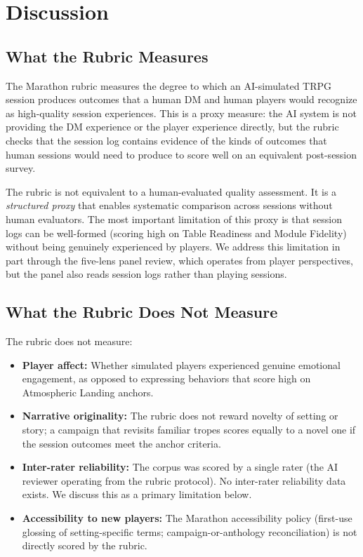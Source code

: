 
\section{Discussion}
\label{sec:discussion}

\subsection{What the Rubric Measures}

The Marathon rubric measures the degree to which an AI-simulated TRPG session produces
outcomes that a human DM and human players would recognize as high-quality session
experiences. This is a proxy measure: the AI system is not providing the DM experience
or the player experience directly, but the rubric checks that the session log contains
evidence of the kinds of outcomes that human sessions would need to produce to score
well on an equivalent post-session survey.

The rubric is not equivalent to a human-evaluated quality assessment. It is a
\textit{structured proxy} that enables systematic comparison across sessions without
human evaluators. The most important limitation of this proxy is that session logs can
be well-formed (scoring high on Table Readiness and Module Fidelity) without being
genuinely experienced by players. We address this limitation in part through the
five-lens panel review, which operates from player perspectives, but the panel also
reads session logs rather than playing sessions.

\subsection{What the Rubric Does Not Measure}

The rubric does not measure:

\begin{itemize}
  \item \textbf{Player affect:} Whether simulated players experienced genuine emotional
        engagement, as opposed to expressing behaviors that score high on Atmospheric
        Landing anchors.
  \item \textbf{Narrative originality:} The rubric does not reward novelty of setting or
        story; a campaign that revisits familiar tropes scores equally to a novel one if
        the session outcomes meet the anchor criteria.
  \item \textbf{Inter-rater reliability:} The corpus was scored by a single rater (the AI
        reviewer operating from the rubric protocol). No inter-rater reliability data exists.
        We discuss this as a primary limitation below.
  \item \textbf{Accessibility to new players:} The Marathon accessibility policy (first-use
        glossing of setting-specific terms; campaign-or-anthology reconciliation) is not
        directly scored by the rubric.
\end{itemize}

